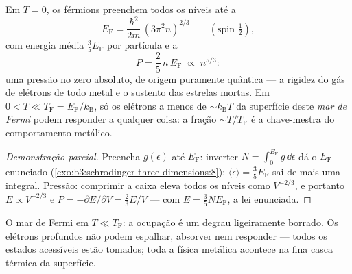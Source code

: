 \begin{theorem}\label{thm:b3:quantum-statistics:fermi}
Em $T = 0$, os férmions preenchem todos os níveis até a \emph{}
\[
E_{\text{F}} = \frac{\hbar^2}{2m}\,(3\pi^2n)^{2/3}
\qquad (\text{spin } \tfrac12) ,
\]
com energia média $\tfrac35 E_{\text{F}}$ por partícula e a
\emph{}
\[
P = \frac25\,n\,E_{\text{F}} \;\propto\; n^{5/3} :
\]
uma pressão no zero absoluto, de origem puramente quântica --- a
rigidez do gás de elétrons de todo metal e o sustento das estrelas
mortas. Em $0 < T \ll T_{\text{F}} = E_{\text{F}}/k_{\text{B}}$,
só os elétrons a menos de $\sim k_{\text{B}}T$ da superfície deste
\emph{mar de Fermi} podem responder a qualquer coisa: a fração
$\sim T/T_{\text{F}}$ é a chave-mestra do comportamento metálico.
\end{theorem}

\begin{proof}[Demonstração parcial]
Preencha $g(\epsilon)$ até $E_{\text{F}}$: inverter $N = \int_0^{
E_{\text{F}}}g\,\dd\epsilon$ dá o $E_{\text{F}}$ enunciado
(\cref{exo:b3:schrodinger-three-dimensions:8}); $\langle\epsilon
\rangle = \tfrac35 E_{\text{F}}$ sai de mais uma integral. Pressão:
comprimir a caixa eleva todos os níveis como $V^{-2/3}$, e portanto $E
\propto V^{-2/3}$ e $P = -\partial E/\partial V = \tfrac23 E/V$
--- com $E = \tfrac35 NE_{\text{F}}$, a lei enunciada.
\end{proof}

\begin{omfigure}

{\small O mar de Fermi em $T \ll T_{\text{F}}$: a ocupação é um degrau
ligeiramente borrado. Os elétrons profundos não podem espalhar, absorver
nem responder --- todos os estados acessíveis estão tomados; toda a
física metálica acontece na fina casca térmica da superfície.}
\end{omfigure}

